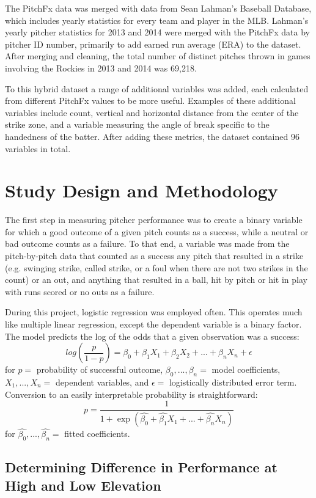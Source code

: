 \documentclass{article}
\begin{document}
The PitchFx data was merged with data from Sean Lahman’s Baseball Database, which includes yearly statistics for every team and player in the MLB.  Lahman’s yearly pitcher statistics for 2013 and 2014 were merged with the PitchFx data by pitcher ID number, primarily to add earned run average (ERA) to the dataset. After merging and cleaning, the total number of distinct pitches thrown in games involving the Rockies in 2013 and 2014 was 69,218. 

To this hybrid dataset a range of additional variables was added, each calculated from different PitchFx values to be more useful. Examples of these additional variables include count, vertical and horizontal distance from the center of the strike zone, and a variable measuring the angle of break specific to the handedness of the batter. After adding these metrics, the dataset contained 96 variables in total. 

\section{Study Design and Methodology}

The first step in measuring pitcher performance was to create a binary variable for which a good outcome of a given pitch counts as a success, while a neutral or bad outcome counts as a failure. To that end, a variable was made from the pitch-by-pitch data that counted as a success any pitch that resulted in a strike (e.g. swinging strike, called strike, or a foul when there are not two strikes in the count) or an out, and anything that resulted in a ball, hit by pitch or hit in play with runs scored or no outs as a failure. 

During this project, logistic regression was employed often. This operates much like multiple linear regression, except the dependent variable is a binary factor. The model predicts the log of the odds that a given observation was a success: 
\[log(\frac{p}{1-p}) = \beta_0 + \beta_1 X_1 + \beta_2 X_2 + ... + \beta_n X_n + \epsilon\]
for \(p = \) probability of successful outcome, \(\beta_0, ..., \beta_n = \) model coefficients, \(X_1, ..., X_n = \) dependent variables, and \(\epsilon = \) logistically distributed error term. 
Conversion to an easily interpretable probability is straightforward:
\[p = \frac{1}{1+\exp{(\hat{\beta_0}+\hat{\beta_1} X_1+...+\hat{\beta_n} X_n)}}\]
for \(\hat{\beta_0},...,\hat{\beta_n} = \) fitted coefficients.

\subsection{Determining Difference in Performance at High and Low Elevation}
\end{document}
